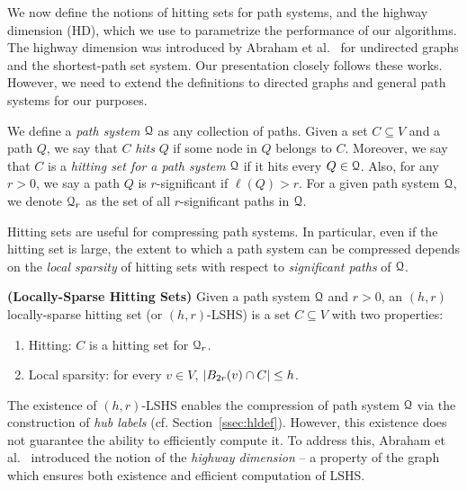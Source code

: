 
We now define the notions of hitting sets for path systems, and the highway dimension (HD), which we use to parametrize the performance of our algorithms. The highway dimension was introduced by Abraham et al.~\cite{highway2013,highway2010} for undirected graphs and the shortest-path set system. 
Our presentation closely follows these works.
However, we need to extend the definitions to directed graphs and general path systems for our purposes. 

We define a \emph{path system} $\calQ$ as any collection of paths.
Given a set $C\subseteq V$ and a path $Q$, we say that $C$ \emph{hits} $Q$ if some node in $Q$ belongs to $C$. Moreover, we say that $C$ is a \emph{hitting set for a path system} $\calQ$ if it hits every $Q\in\calQ$. Also, for any $r>0$, we say a path $Q$ is $r$-significant if $\ell(Q)>r$. 
For a given path system $\calQ$, we denote $\calQ_r$ as the set of all $r$-significant paths in $\calQ$.

Hitting sets are useful for compressing path systems. In particular, even if the hitting set is large, the extent to which a path system can be compressed depends on the \emph{local sparsity} of hitting sets with respect to \emph{significant paths} of $\calQ$.

\begin{definition}
\label{def:lshs}
\textbf{(Locally-Sparse Hitting Sets)} Given a path system $\calQ$ and $r>0$, an $(h,r)$ locally-sparse hitting set (or $(h,r)$-LSHS) is a set $C\subseteq V$ with two properties: 
\begin{enumerate}[nosep]
\item Hitting: $C$ is a hitting set for $\calQ_r$.
\item Local sparsity: for every $v\in V$, $\abs*{B_{2r}(v)\cap C}\leq h$.
\end{enumerate}
\end{definition}


The existence of $(h,r)$-LSHS enables the compression of path system $\calQ$ via the construction of \emph{hub labels} (cf. Section~\ref{ssec:hldef}). However, this existence does not guarantee the ability to efficiently compute it. 
To address this, Abraham et al.~\cite{highway2013} introduced the notion of the \emph{highway dimension} -- a property of the graph which ensures both existence and efficient computation of LSHS. 

